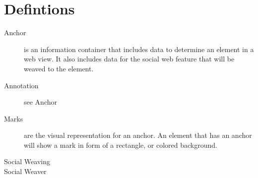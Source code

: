 \section{Defintions}

\begin{description}

	\item[Anchor] is an information container that includes data to determine an element in a web view. It also includes data for the social web feature that will be weaved to the element. 
	
	\item[Annotation] see Anchor
	
	\item[Marks] are the visual representation for an anchor. An element that has an anchor will show a mark in form of a rectangle, or colored background. 
	
	\item[Social Weaving] 
	\item[Social Weaver]

\end{description}
